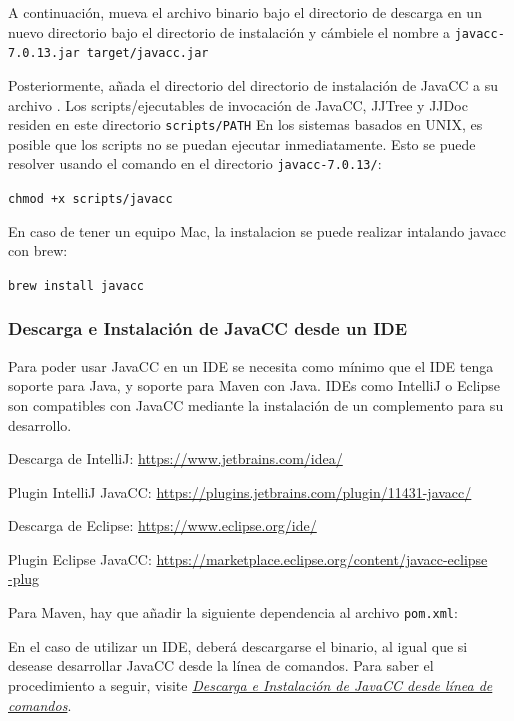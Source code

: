 A continuación, mueva el archivo binario bajo el directorio de descarga en un nuevo directorio bajo el directorio de instalación y cámbiele el nombre a \lstinline|javacc-7.0.13.jar target/javacc.jar|


Posteriormente, añada el directorio del directorio de instalación de JavaCC a su archivo . Los scripts/ejecutables de invocación de JavaCC, JJTree y JJDoc residen en este directorio \lstinline|scripts/PATH|
En los sistemas basados en UNIX, es posible que los scripts no se puedan ejecutar inmediatamente. Esto se puede resolver usando el comando en el directorio \lstinline|javacc-7.0.13/|:

\lstinline|chmod +x scripts/javacc|

En caso de tener un equipo Mac, la instalacion se puede realizar intalando javacc con brew:

\lstinline|brew install javacc|

\subsubsection{Descarga e Instalación de JavaCC desde un IDE}

Para poder usar JavaCC en un IDE se necesita como mínimo que el IDE tenga soporte para Java, y soporte para Maven con Java. IDEs como IntelliJ o Eclipse son compatibles con JavaCC mediante la instalación de un complemento para su desarrollo.

 Descarga de IntelliJ: \href{https://www.jetbrains.com/idea/}{https://www.jetbrains.com/idea/}
 
 Plugin IntelliJ JavaCC: \href{https://plugins.jetbrains.com/plugin/11431-javacc/}{https://plugins.jetbrains.com/plugin/11431-javacc/}
 
 Descarga de Eclipse: \href{https://www.eclipse.org/ide/}{https://www.eclipse.org/ide/}
 
 Plugin Eclipse JavaCC: \href{https://marketplace.eclipse.org/content/javacc-eclipse-plug}{https://marketplace.eclipse.org/content/javacc-eclipse\\-plug}

Para Maven, hay que añadir la siguiente dependencia al archivo \lstinline|pom.xml|:


\lstset{inputencoding=utf8/latin1}


En el caso de utilizar un IDE, deberá descargarse el binario, al igual que si desease desarrollar JavaCC desde la línea de comandos. Para saber el procedimiento a seguir, visite \href{sec:descargaeinstalaciondejavaccdesdelineadecomandos}{\textit{Descarga e Instalación de JavaCC desde línea de comandos}}.

